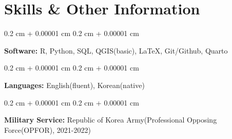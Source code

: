 \documentclass[10pt, letterpaper]{article}
\newenvironment{onecolentry}{
	\begin{adjustwidth}{
			0.2 cm + 0.00001 cm
		}{
			0.2 cm + 0.00001 cm
		}
	}{
	\end{adjustwidth}
} %
\begin{document}
\vspace{12pt}

	\section{Skills \& Other Information}
	
	\begin{onecolentry}
		\textbf{Software:} R, Python, SQL, QGIS(basic), \LaTeX, Git/Github, Quarto
	\end{onecolentry}
	
	
	\vspace{0.2 cm}
	
	\begin{onecolentry}
		\textbf{Languages:} English(fluent), Korean(native)
	\end{onecolentry}
	
	\vspace{0.2 cm}
	
	\begin{onecolentry}
		\textbf{Military Service:} Republic of Korea Army(Professional Opposing Force(OPFOR), 2021-2022)
	\end{onecolentry}
	
\end{document}
